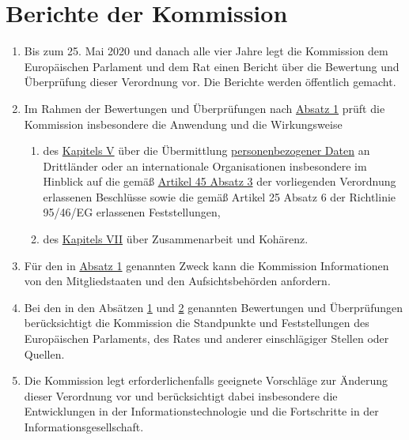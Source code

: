 \chapter{Berichte der Kommission}
\label{ch:97}


\begin{enumerate}

  \item Bis zum 25. Mai 2020 und danach alle vier Jahre legt die Kommission dem Europäischen Parlament und dem Rat einen
   Bericht über die Bewertung und Überprüfung dieser Verordnung vor. Die Berichte werden öffentlich gemacht.
  \label{itm:97-1}

  \item Im Rahmen der Bewertungen und Überprüfungen nach \hyperref[itm:97-1]{Absatz 1} prüft die Kommission insbesondere
   die Anwendung und die Wirkungsweise
  \label{itm:97-2}

  \begin{enumerate}
  
    \item des \hyperref[part:5]{Kapitels V} über die Übermittlung \hyperref[itm:04-1]{personenbezogener Daten} an Drittländer oder an
     internationale Organisationen insbesondere im Hinblick auf die gemäß \hyperref[itm:45-3]{Artikel 45 Absatz 3} der
     vorliegenden Verordnung erlassenen Beschlüsse sowie die gemäß Artikel 25 Absatz 6 der Richtlinie 95/46/EG
     erlassenen Feststellungen,
    \label{itm:97-2a}

    \item des \hyperref[part:7]{Kapitels VII} über Zusammenarbeit und Kohärenz.
    \label{itm:97-2b}

  \end{enumerate}

  \item Für den in \hyperref[itm:97-1]{Absatz 1} genannten Zweck kann die Kommission Informationen von den
   Mitgliedstaaten und den Aufsichtsbehörden anfordern.
  \label{itm:97-3}

  \item Bei den in den Absätzen \hyperref[itm:97-1]{1} und \hyperref[itm:97-2]{2} genannten Bewertungen und
   Überprüfungen berücksichtigt die Kommission die Standpunkte und Feststellungen des Europäischen Parlaments, des
   Rates und anderer einschlägiger Stellen oder Quellen.
  \label{itm:97-4}

  \item Die Kommission legt erforderlichenfalls geeignete Vorschläge zur Änderung dieser Verordnung vor und
   berücksichtigt dabei insbesondere die Entwicklungen in der Informationstechnologie und die Fortschritte in der
   Informationsgesellschaft.
  \label{itm:97-5}

\end{enumerate}


